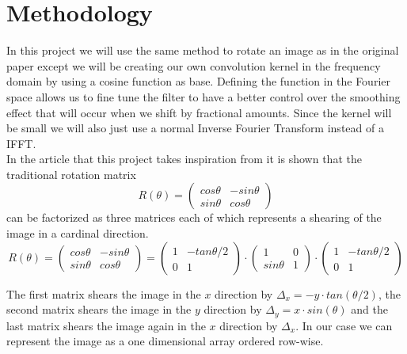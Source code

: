 \documentclass[]{usiinfbachelorproject}
\begin{document}
	\section{Methodology}	
		In this project we will use the same method to rotate an image as in the original paper \cite{main_article} except we will be creating our own convolution kernel in the frequency domain by using a cosine function as base. Defining the function in the Fourier space allows us to fine tune the filter to have a better control over the smoothing effect that will occur when we shift by fractional amounts. Since the kernel will be small we will also just use a normal Inverse Fourier Transform instead of a IFFT. \\
		In the article that this project takes inspiration from it is shown that the traditional rotation matrix
	\begin{equation*}
		R(\theta) = 
		\begin{pmatrix}
			cos\theta & -sin\theta\\
			sin\theta & cos\theta
		\end{pmatrix}
	\end{equation*} 
	can be factorized as three matrices each of which represents a shearing of the image in a cardinal direction.
	\begin{equation*}
		R(\theta) = 
		\begin{pmatrix}
			cos\theta & -sin\theta\\
			sin\theta & cos\theta
		\end{pmatrix}
		=
		\begin{pmatrix}
			1 & -tan\theta/2\\
			0 & 1
		\end{pmatrix}
		\cdot
		\begin{pmatrix}
			1 & 0\\
			sin\theta & 1
		\end{pmatrix}
		\cdot
		\begin{pmatrix}
			1 & -tan\theta/2\\
			0 & 1
		\end{pmatrix}
	\end{equation*} 
	
	The first matrix shears the image in the $x$ direction by $\Delta_x = -y\cdot tan(\theta/2)$, the second matrix shears the image in the $y$ direction by $\Delta_y = x \cdot sin(\theta)$ and the last matrix shears the image again in the $x$ direction by $\Delta_x$.
	In our case we can represent the image as a one dimensional array ordered row-wise. 
		
\end{document}
